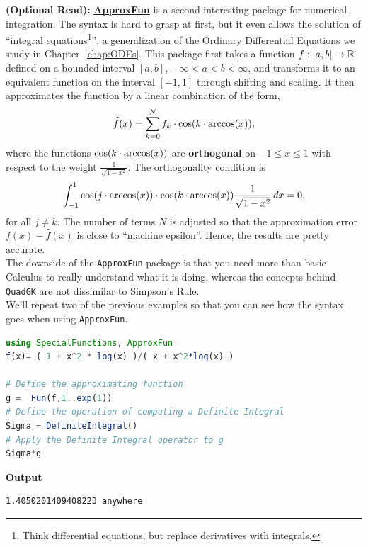 \textbf{(Optional Read):} \href{https://juliaapproximation.github.io/ApproxFun.jl/dev/}{\bf ApproxFun} is a second interesting package for numerical integration. The syntax is hard to grasp at first, but it even allows the solution of ``integral equations\footnote{Think differential equations, but replace derivatives with integrals.}'', a generalization of the Ordinary Differential Equations we study in Chapter~\ref{chap:ODEs}. This package first takes a function $f:[a, b] \to \mathbb R$ defined on a bounded interval $[a, b]$,  $-\infty < a < b < \infty$, and transforms it to an equivalent function on the interval $[-1, 1]$ through shifting and scaling. It then 
approximates the function by a linear combination of the form, 
$$\widehat{f}(x) = \sum_{k=0}^N f_k \cdot \cos(k \cdot \mathrm{arccos}(x)),$$
where the functions $\cos(k \cdot \mathrm{arccos}(x))$ are \textbf{orthogonal} on $-1 \le x \le 1$ with respect to the weight $\frac{1}{\sqrt{1 - x^2}}$.  The orthogonality condition is
$$ \int_{-1}^{1} \cos(j\cdot \mathrm{arccos}(x)) \cdot \cos(k \cdot \mathrm{arccos}(x))\frac{1}{\sqrt{1 - x^2}}\, dx = 0, $$
for all $j \neq k$. The number of terms $N$ is adjusted so that the approximation error $f(x) - \widehat{f}(x)$ is close to ``machine epsilon''. Hence, the results are pretty accurate.\\

The downside of the \texttt{ApproxFun} package is that you need more than basic Calculus to really understand what it is doing, whereas the concepts behind \texttt{QuadGK} are not dissimilar to Simpson's Rule.\\

We'll repeat two of the previous examples so that you can see how the syntax goes when using \texttt{ApproxFun}. \\

\begin{lstlisting}[language=Julia,style=mystyle]
using SpecialFunctions, ApproxFun
f(x)= ( 1 + x^2 * log(x) )/( x + x^2*log(x) )

# Define the approximating function
g =  Fun(f,1..exp(1)) 
# Define the operation of computing a Definite Integral
Sigma = DefiniteIntegral() 
# Apply the Definite Integral operator to g
Sigma*g
\end{lstlisting}
\textbf{Output} 
\begin{verbatim}
1.4050201409408223 anywhere
\end{verbatim}

\bigskip

